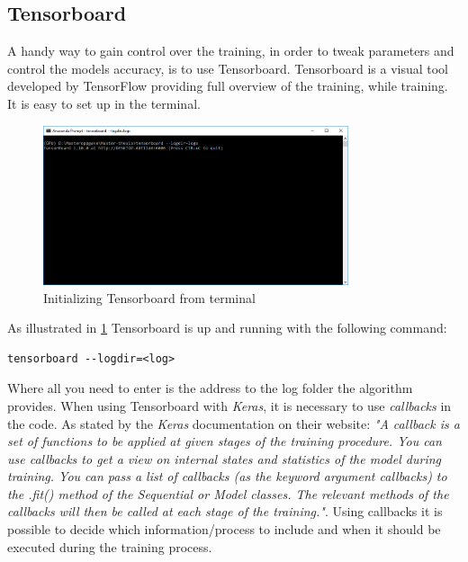 \documentclass[USenglish]{ifimaster}  %
\begin{document}
\subsection{Tensorboard}
A handy way to gain control over the training, in order to tweak parameters and control the models accuracy, is to use Tensorboard. Tensorboard is a visual tool developed by TensorFlow providing full overview of the training, while training. It is easy to set up in the terminal.
\begin{figure}[H]
    \centering
    \includegraphics[width=0.8\textwidth]{bilder/tensorboard_anaconda_prompt.PNG}
    \caption{Initializing Tensorboard from terminal}
    \label{fig:tensorboard_anaconda_prompt}
\end{figure}
As illustrated in \cref{fig:tensorboard_anaconda_prompt} Tensorboard is up and running with the following command: 

\begin{verbatim}
tensorboard --logdir=<log> 
\end{verbatim}
Where all you need to enter is the address to the log folder the algorithm provides. 
\newline
When using Tensorboard with \textit{Keras}, it is necessary to use \textit{callbacks} in the code. As stated by the \textit{Keras} documentation on their website:
\newline
\newline
\textit{"A callback is a set of functions to be applied at given stages of the training procedure. You can use callbacks to get a view on internal states and statistics of the model during training. You can pass a list of callbacks (as the keyword argument callbacks) to the .fit() method of the Sequential or Model classes. The relevant methods of the callbacks will then be called at each stage of the training."}\cite{website:Keras_doc}. 
\newline
\newline
Using callbacks it is possible to decide which information/process to include and when it should be executed during the training process.
\end{document}
